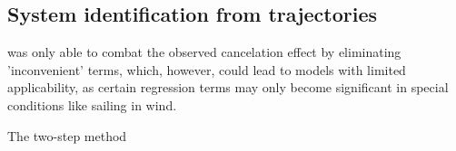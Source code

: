 \subsection{System identification from trajectories} \label{sec:system_identification}

\textcite{abkowitz_measurement_1980} was only able to combat the observed cancelation effect by eliminating 'inconvenient' terms, which, however, could lead to models with limited applicability, as certain regression terms may only become significant in special conditions like sailing in wind.



The two-step method 